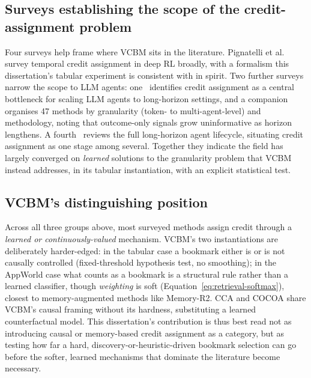 \subsection{Surveys establishing the scope of the credit-assignment problem}
\label{sec:rw-surveys}

Four surveys help frame where VCBM sits in the literature. Pignatelli et al.~\cite{pignatelli2023survey} survey temporal credit assignment in deep RL broadly, with a formalism this dissertation's tabular experiment is consistent with in spirit. Two further surveys narrow the scope to LLM agents: one~\cite{agentic_rl_survey2026} identifies credit assignment as a central bottleneck for scaling LLM agents to long-horizon settings, and a companion~\cite{agentic_ca_survey2026} organises 47 methods by granularity (token- to multi-agent-level) and methodology, noting that outcome-only signals grow uninformative as horizon lengthens. A fourth~\cite{long_horizon_agents_survey2025} reviews the full long-horizon agent lifecycle, situating credit assignment as one stage among several. Together they indicate the field has largely converged on \emph{learned} solutions to the granularity problem that VCBM instead addresses, in its tabular instantiation, with an explicit statistical test.

\subsection{VCBM's distinguishing position}
\label{sec:rw-position}

Across all three groups above, most surveyed methods assign credit through a \emph{learned or continuously-valued} mechanism. VCBM's two instantiations are deliberately harder-edged: in the tabular case a bookmark either is or is not causally controlled (fixed-threshold hypothesis test, no smoothing); in the AppWorld case what counts as a bookmark is a structural rule rather than a learned classifier, though \emph{weighting} is soft (Equation~\ref{eq:retrieval-softmax}), closest to memory-augmented methods like Memory-R2. CCA and COCOA share VCBM's causal framing without its hardness, substituting a learned counterfactual model. This dissertation's contribution is thus best read not as introducing causal or memory-based credit assignment as a category, but as testing how far a hard, discovery-or-heuristic-driven bookmark selection can go before the softer, learned mechanisms that dominate the literature become necessary.


